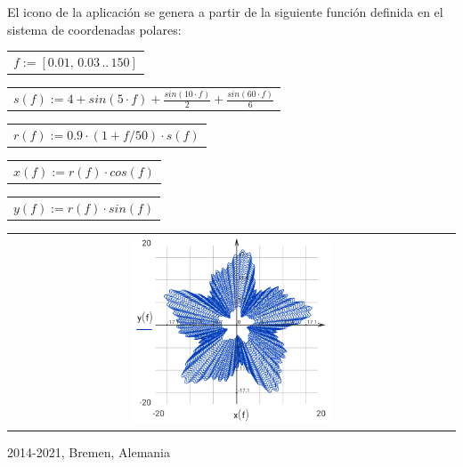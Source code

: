 \documentclass[DIV=calc, paper=a4, fontsize=11pt, twocolumn]{scrartcl}
\begin{document}
El icono de la aplicación se genera a
partir de la siguiente función
definida en el sistema de coordenadas
polares:
\begin{center}\begin{tabular}{c}
                $f := \left[ 0.01,\, 0.03 \,..\, 150 \right]$
\end{tabular}\end{center}
\begin{center}\begin{tabular}{c}
                $s(f) := 4 + sin \left( 5 \cdot f\right)  + \frac{sin \left( 10 \cdot f\right) }{2} + \frac{sin \left( 60 \cdot f\right) }{6}$
\end{tabular}\end{center}
\begin{center}\begin{tabular}{c}
                $r(f) := 0.9 \cdot \left( 1 + f / 50 \right) \cdot s \left( f\right) $
\end{tabular}\end{center}
\begin{center}\begin{tabular}{c}
                $x(f) := r \left( f\right)  \cdot cos \left( f\right) $
\end{tabular}\end{center}
\begin{center}\begin{tabular}{c}
                $y(f) := r \left( f\right)  \cdot sin \left( f\right) $
\end{tabular}\end{center}
\begin{center}\begin{tabular}{c} \includegraphics[width=0.45\textwidth]{graphics/about_micromath_fig1.png} \end{tabular}\end{center}

2014-2021, Bremen, Alemania
\end{document}
